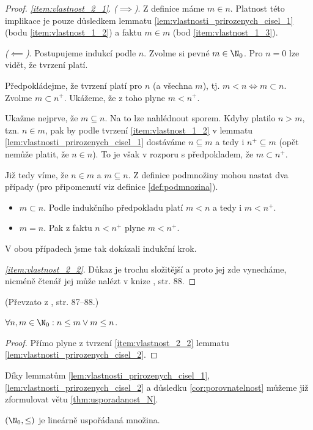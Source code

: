 \begin{proof}
    \textit{\ref{item:vlastnost_2_1}}. \textit{($\implies$)}. Z definice máme $m\in n$. Platnost této implikace je pouze důsledkem lemmatu \ref{lem:vlastnosti_prirozenych_cisel_1} (bodu \ref{item:vlastnost_1_2}) a faktu $m\in m$ (bod \ref{item:vlastnost_1_3}).\par
    \textit{($\impliedby$)}. Postupujeme indukcí podle $n$. Zvolme si pevné $m\in\N_0$. Pro $n=0$ lze vidět, že tvrzení platí.\par
    Předpokládejme, že tvrzení platí pro $n$ (a všechna $m$), tj. $m<n\iff m\subset n$. Zvolme $m\subset n^+$. Ukážeme, že z toho plyne $m<n^+$.\par
    Ukažme nejprve, že $m\subseteq n$. Na to lze nahlédnout sporem. Kdyby platilo $n>m$, tzn. $n\in m$, pak by podle tvrzení \ref{item:vlastnost_1_2} v lemmatu \ref{lem:vlastnosti_prirozenych_cisel_1} dostáváme $n\subseteq m$ a tedy i $n^+\subseteq m$ (opět nemůže platit, že $n\in n$). To je však v rozporu s předpokladem, že $m\subset n^+$.\par
    Již tedy víme, že $n\in m$ a $m\subseteq n$. Z definice podmnožiny mohou nastat dva případy (pro připomenutí viz definice \ref{def:podmnozina}).
    \begin{itemize}
        \item $m\subset n$. Podle indukčního předpokladu platí $m<n$ a tedy i $m<n^+$.
        \item $m=n$. Pak z faktu $n<n^+$ plyne $m<n^+$.
    \end{itemize}
    V obou případech jsme tak dokázali indukční krok.\par
    \textit{\ref{item:vlastnost_2_2}}. Důkaz je trochu složitější a proto jej zde vynecháme, nicméně čtenář jej může nalézt v knize \cite{BalcarStepanek1986}, str. 88.
\end{proof}
(Převzato z \cite{BalcarStepanek1986}, str. 87--88.)\par
\begin{corollary}\label{cor:porovnatelnost}
    $\forall n,m\in\N_0: n\leq m \lor m\leq n$.
\end{corollary}
\begin{proof}
    Přímo plyne z tvrzení \ref{item:vlastnost_2_2} lemmatu \ref{lem:vlastnosti_prirozenych_cisel_2}.
\end{proof}
Díky lemmatům \ref{lem:vlastnosti_prirozenych_cisel_1}, \ref{lem:vlastnosti_prirozenych_cisel_2} a důsledku \ref{cor:porovnatelnost} můžeme již zformulovat větu \ref{thm:usporadanost_N}.
\begin{theorem}\label{thm:usporadanost_N}
    $(\N_0,\leq)$ je lineárně uspořádaná množina.
\end{theorem}
